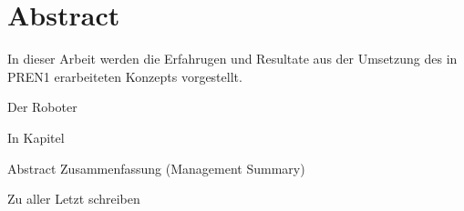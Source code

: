 \section*{Abstract}

In dieser Arbeit werden die Erfahrugen und Resultate aus der Umsetzung des in PREN1 erarbeiteten Konzepts vorgestellt. 

Der Roboter 

In Kapitel

Abstract
Zusammenfassung (Management Summary)

Zu aller Letzt schreiben